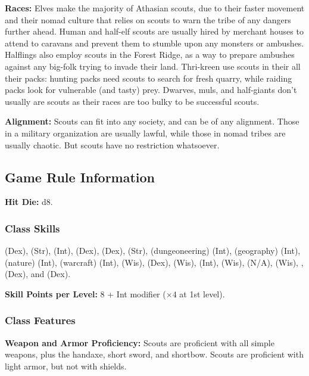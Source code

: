 \textbf{Races:} Elves make the majority of Athasian scouts, due to their faster movement and their nomad culture that relies on scouts to warn the tribe of any dangers further ahead. Human and half-elf scouts are usually hired by merchant houses to attend to caravans and prevent them to stumble upon any monsters or ambushes. Halflings also employ scouts in the Forest Ridge, as a way to prepare ambushes against any big-folk trying to invade their land. Thri-kreen use scouts in their all their packs: hunting packs need scouts to search for fresh quarry, while raiding packs look for vulnerable (and tasty) prey. Dwarves, muls, and half-giants don't usually are scouts as their races are too bulky to be successful scouts.

\textbf{Alignment:} Scouts can fit into any society, and can be of any alignment. Those in a military organization are usually lawful, while those in nomad tribes are usually chaotic. But scouts have no restriction whatsoever.

\subsection{Game Rule Information}
\textbf{Hit Die:} d8.

\subsubsection{Class Skills}
 (Dex),  (Str),  (Int),  (Dex),  (Dex),  (Str),  (dungeoneering) (Int),  (geography) (Int),  (nature) (Int),  (warcraft) (Int),  (Wis),  (Dex),  (Wis),  (Int),  (Wis),  (N/A),  (Wis), ,  (Dex), and  (Dex).

\textbf{Skill Points per Level:} 8 + Int modifier ($\times4$ at 1st level).

\subsubsection{Class Features}
\textbf{Weapon and Armor Proficiency:} Scouts are proficient with all simple weapons, plus the handaxe, short sword, and shortbow. Scouts are proficient with light armor, but not with shields.


